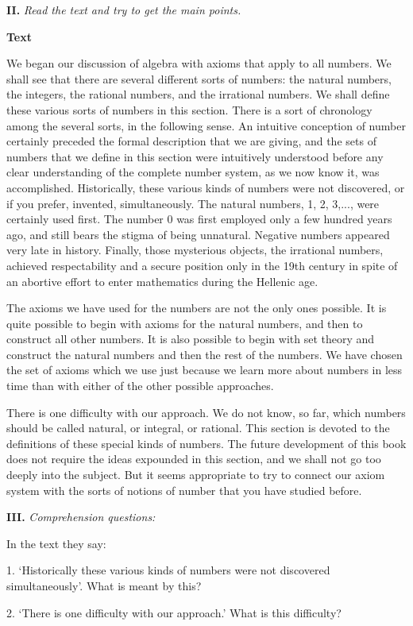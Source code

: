 \documentclass[a4paper]{article}
\newcommand{\ESect}[1]{\medskip\par{\large \textbf{#1}}\par}
\newcommand{\ETask}[2]{\medskip\par\textbf{#1.} \textit{#2}\par}
\begin{document}
\ETask{II}{Read the text and try to get the main points.}
\ESect{Text} We began our discussion of algebra with axioms that
apply to all numbers. We shall see that there are several
different sorts of numbers: the natural numbers, the integers, the
rational numbers, and the irrational numbers. We shall define
these various sorts of numbers in this section. There is a sort of
chronology among the several sorts, in the following sense. An
intuitive conception of number certainly preceded the formal
description that we are giving, and the sets of numbers that we
define in this section were intuitively understood before any
clear understanding of the complete number system, as we now know
it, was accomplished. Historically, these various kinds of numbers
were not discovered, or if you prefer, invented, simultaneously.
The natural numbers, 1, 2, 3,..., were certainly used first. The
number 0 was first employed only a few hundred years ago, and
still bears the stigma of being unnatural. Negative numbers
appeared very late in history. Finally, those mysterious objects,
the irrational numbers, achieved respectability and a secure
position only in the 19th century in spite of an abortive effort
to enter mathematics during the Hellenic age.

The axioms we have used for the numbers are not the only ones possible. It is quite possible to begin with axioms for
the natural numbers, and then to construct all other numbers. It is also possible to begin with set theory and construct
the natural numbers and then the rest of the numbers. We have chosen the set of axioms which we use just because we learn
more about numbers in less time than with either of the other possible approaches.

There is one difficulty with our approach. We do not know, so far, which numbers should be called natural, or integral,
or rational. This section is devoted to the definitions of these special kinds of numbers. The future development of this
book does not require the ideas expounded in this section, and we shall not go too deeply into the subject. But it seems
appropriate to try to connect our axiom system with the sorts of notions of number that you have studied before.

\ETask{III}{Comprehension questions:}
In the text they say:

1. `Historically these various kinds of numbers were not discovered simultaneously'. What is meant by this?

2. `There is one difficulty with our approach.' What is this difficulty?
\end{document}
